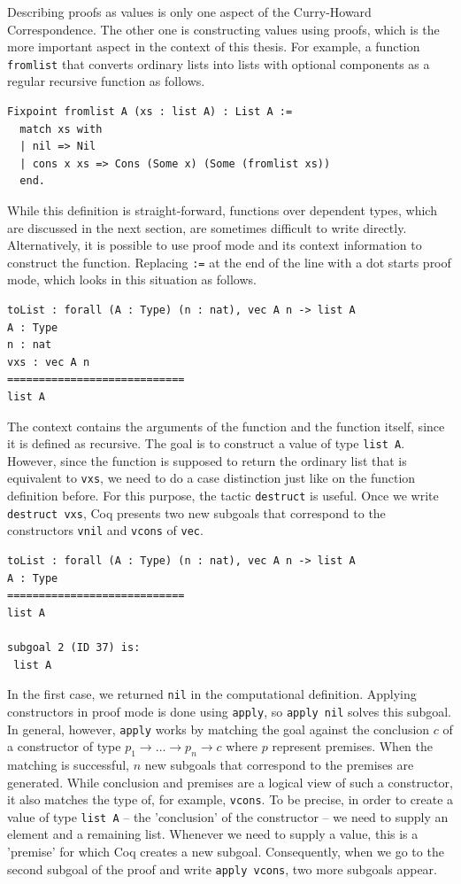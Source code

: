 \documentclass[a4paper, 11pt, fleqn, twoside]{scrreprt}
\newcommand{\cinl}[1]{\texttt{#1}}
\begin{document}
Describing proofs as values is only one aspect of the Curry-Howard Correspondence.
The other one is constructing values using proofs, which is the more important aspect in the context of this thesis.
For example, a function \cinl{fromlist} that converts ordinary lists into lists with optional components as a regular recursive function as follows.

\begin{verbatim}
Fixpoint fromlist A (xs : list A) : List A :=
  match xs with
  | nil => Nil
  | cons x xs => Cons (Some x) (Some (fromlist xs))
  end.
\end{verbatim}

While this definition is straight-forward, functions over dependent types, which are discussed in the next section, are sometimes difficult to write directly.
Alternatively, it is possible to use proof mode and its context information to construct the function.
Replacing \cinl{:=} at the end of the line with a dot starts proof mode, which looks in this situation as follows.

\begin{verbatim}
toList : forall (A : Type) (n : nat), vec A n -> list A
A : Type
n : nat
vxs : vec A n
============================
list A
\end{verbatim}

The context contains the arguments of the function and the function itself, since it is defined as recursive.
The goal is to construct a value of type \cinl{list A}.
However, since the function is supposed to return the ordinary list that is equivalent to \cinl{vxs}, we need to do a case distinction just like on the function definition before.
For this purpose, the tactic \cinl{destruct} is useful.
Once we write \cinl{destruct vxs}, Coq presents two new subgoals that correspond to the constructors \cinl{vnil} and \cinl{vcons} of \cinl{vec}.

\begin{verbatim}
toList : forall (A : Type) (n : nat), vec A n -> list A
A : Type
============================
list A

subgoal 2 (ID 37) is:
 list A
\end{verbatim}

In the first case, we returned \cinl{nil} in the computational definition.
Applying constructors in proof mode is done using \cinl{apply}, so \cinl{apply nil} solves this subgoal.
In general, however, \cinl{apply} works by matching the goal against the conclusion $c$ of a constructor of type $p_1 \rightarrow \dots \rightarrow p_n \rightarrow c$ where $p$ represent premises.
When the matching is successful, $n$ new subgoals that correspond to the premises are generated.
While conclusion and premises are a logical view of such a constructor, it also matches the type of, for example, \cinl{vcons}.
To be precise, in order to create a value of type \cinl{list A} -- the 'conclusion' of the constructor -- we need to supply an element and a remaining list.
Whenever we need to supply a value, this is a 'premise' for which Coq creates a new subgoal.
Consequently, when we go to the second subgoal of the proof and write \cinl{apply vcons}, two more subgoals appear.
\end{document}
